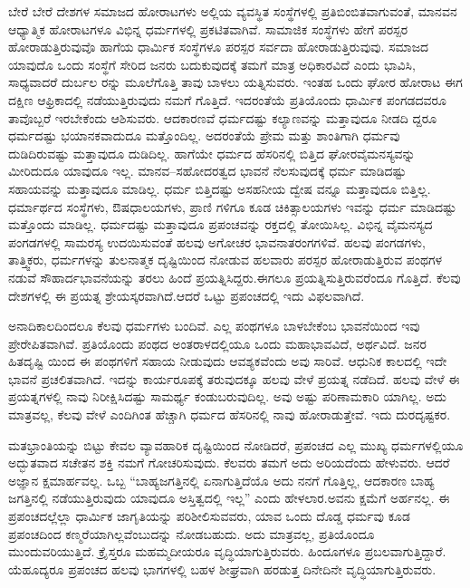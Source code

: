 ಬೇರೆ ಬೇರೆ ದೇಶಗಳ ಸಮಾಜದ ಹೋರಾಟಗಳು ಅಲ್ಲಿಯ ವ್ಯವಸ್ಥಿತ ಸಂಸ್ಥೆಗಳಲ್ಲಿ ಪ್ರತಿಬಿಂಬಿತವಾಗುವಂತೆ, ಮಾನವನ ಆಧ್ಯಾತ್ಮಿಕ ಹೋರಾಟಗಳೂ ವಿಭಿನ್ನ ಧರ್ಮಗಳಲ್ಲಿ ಪ್ರಕಟಿತವಾಗಿವೆ. ಸಾಮಾಜಿಕ ಸಂಸ್ಥೆಗಳು ಹೇಗೆ ಪರಸ್ಪರ ಹೋರಾಡುತ್ತಿರುವುವೊ ಹಾಗೆಯ ಧಾರ್ಮಿಕ ಸಂಸ್ಥೆಗಳೂ ಪರಸ್ಪರ ಸರ್ವದಾ ಹೋರಾಡುತ್ತಿರುವುವು. ಸಮಾಜದ ಯಾವುದೊ ಒಂದು ಸಂಸ್ಥೆಗೆ ಸೇರಿದ ಜನರು ಬದುಕುವುದಕ್ಕೆ ತಮಗೆ ಮಾತ್ರ ಅಧಿಕಾರವಿದೆ ಎಂದು ಭಾವಿಸಿ, ಸಾಧ್ಯವಾದರೆ ದುರ್ಬಲ ರನ್ನು ಮೂಲೆಗೊತ್ತಿ ತಾವು ಬಾಳಲು ಯತ್ನಿಸುವರು. ಇಂತಹ ಒಂದು ಘೋರ ಹೋರಾಟ ಈಗ ದಕ್ಷಿಣ ಆಫ್ರಿಕಾದಲ್ಲಿ ನಡೆಯುತ್ತಿರುವುದು ನಮಗೆ ಗೊತ್ತಿದೆ. ಇದರಂತೆಯೆ ಪ್ರತಿಯೊಂದು ಧಾರ್ಮಿಕ ಪಂಗಡದವರೂ ತಾವೊಬ್ಬರೆ ಇರಬೇಕೆಂದು ಆಶಿಸುವರು. ಆದಕಾರಣವೆ ಧರ್ಮದಷ್ಟು ಕಲ್ಯಾಣವನ್ನು ಮತ್ತಾವುದೂ ನೀಡದಿ ದ್ದರೂ ಧರ್ಮದಷ್ಟು ಭಯಾನಕವಾದುದೂ ಮತ್ತೊಂದಿಲ್ಲ. ಅದರಂತೆಯೆ ಪ್ರೇಮ ಮತ್ತು ಶಾಂತಿಗಾಗಿ ಧರ್ಮವು ದುಡಿದಿರುವಷ್ಟು ಮತ್ತಾವುದೂ ದುಡಿದಿಲ್ಲ. ಹಾಗೆಯೇ ಧರ್ಮದ ಹೆಸರಿನಲ್ಲಿ ಬಿತ್ತಿದ ಘೋರವೈಮನಸ್ಯವನ್ನು ಮೀರಿದುದೂ ಯಾವುದೂ ಇಲ್ಲ. ಮಾನವ–ಸಹೋದರತ್ವದ ಭಾವನೆ ನೆಲಸುವುದಕ್ಕೆ ಧರ್ಮ ಮಾಡಿದಷ್ಟು ಸಹಾಯವನ್ನು ಮತ್ತಾವುದೂ ಮಾಡಿಲ್ಲ. ಧರ್ಮ ಬಿತ್ತಿದಷ್ಟು ಅಸಹನೀಯ ದ್ವೇಷ ವನ್ನೂ ಮತ್ತಾವುದೂ ಬಿತ್ತಿಲ್ಲ. ಧರ್ಮಾರ್ಥದ ಸಂಸ್ಥೆಗಳು, ಔಷಧಾಲಯಗಳು, ಪ್ರಾಣಿ ಗಳಿಗೂ ಕೂಡ ಚಿಕಿತ್ಸಾಲಯಗಳು ಇವನ್ನು ಧರ್ಮ ಮಾಡಿದಷ್ಟು ಮತ್ತೊಂದು ಮಾಡಿಲ್ಲ. ಧರ್ಮದಷ್ಟು ಮತ್ತಾವುದೂ ಪ್ರಪಂಚವನ್ನು ರಕ್ತದಲ್ಲಿ ತೋಯಿಸಿಲ್ಲ. ವಿಭಿನ್ನ ವೈಮನಸ್ಯದ ಪಂಗಡಗಳಲ್ಲಿ ಸಾಮರಸ್ಯ ಉದಯಿಸುವಂತೆ ಹಲವು ಅಗೋಚರ ಭಾವನಾತರಂಗಗಳಿವೆ. ಹಲವು ಪಂಗಡಗಳು, ತಾತ್ತ್ವಿಕರು, ಧರ್ಮಗಳನ್ನು ತುಲನಾತ್ಮಕ ದೃಷ್ಟಿಯಿಂದ ನೋಡುವ ಹಲವಾರು ಪರಸ್ಪರ ಹೋರಾಡುತ್ತಿರುವ ಪಂಥಗಳ ನಡುವೆ ಸೌಹಾರ್ದಭಾವನೆಯನ್ನು ತರಲು ಹಿಂದೆ ಪ್ರಯತ್ನಿಸಿದ್ದರು.ಈಗಲೂ ಪ್ರಯತ್ನಿಸುತ್ತಿರುವರೆಂದೂ ಗೊತ್ತಿದೆ. ಕೆಲವು ದೇಶಗಳಲ್ಲಿ ಈ ಪ್ರಯತ್ನ ಶ್ರೇಯಸ್ಕರವಾಗಿದೆ.ಆದರೆ ಒಟ್ಟು ಪ್ರಪಂಚದಲ್ಲಿ ಇದು ವಿಫಲವಾಗಿದೆ.

ಅನಾದಿಕಾಲದಿಂದಲೂ ಕೆಲವು ಧರ್ಮಗಳು ಬಂದಿವೆ. ಎಲ್ಲ ಪಂಥಗಳೂ ಬಾಳಬೇಕೆಂಬ ಭಾವನೆಯಿಂದ ಇವು ಪ್ರೇರೇಪಿತವಾಗಿವೆ. ಪ್ರತಿಯೊಂದು ಪಂಥದ ಅಂತರಾಳದಲ್ಲಿಯೂ ಒಂದು ಮಹಾಭಾವವಿದೆ, ಅರ್ಥವಿದೆ. ಜನರ ಹಿತದೃಷ್ಟಿ ಯಿಂದ ಈ ಪಂಥಗಳಿಗೆ ಸಹಾಯ ನೀಡುವುದು ಆವಶ್ಯಕವೆಂದು ಅವು ಸಾರಿವೆ. ಆಧುನಿಕ ಕಾಲದಲ್ಲಿ ಇದೇ ಭಾವನೆ ಪ್ರಚಲಿತವಾಗಿದೆ. ಇದನ್ನು ಕಾರ್ಯರೂಪಕ್ಕೆ ತರುವುದಕ್ಕೂ ಹಲವು ವೇಳೆ ಪ್ರಯತ್ನ ನಡೆದಿದೆ. ಹಲವು ವೇಳೆ ಈ ಪ್ರಯತ್ನಗಳಲ್ಲಿ ನಾವು ನಿರೀಕ್ಷಿಸಿದಷ್ಟು ಸಾಮರ್ಥ್ಯ ಕಂಡುಬರುವುದಿಲ್ಲ. ಅವು ಅಷ್ಟು ಪರಿಣಾಮಕಾರಿ ಯಾಗಿಲ್ಲ. ಅದು ಮಾತ್ರವಲ್ಲ, ಕೆಲವು ವೇಳೆ ಎಂದಿಗಿಂತ ಹೆಚ್ಚಾಗಿ ಧರ್ಮದ ಹೆಸರಿನಲ್ಲಿ ನಾವು ಹೋರಾಡುತ್ತೇವೆ. ಇದು ದುರದೃಷ್ಟಕರ.

ಮತಭ್ರಾಂತಿಯನ್ನು ಬಿಟ್ಟು ಕೇವಲ ವ್ಯಾವಹಾರಿಕ ದೃಷ್ಟಿಯಿಂದ ನೋಡಿದರೆ, ಪ್ರಪಂಚದ ಎಲ್ಲ ಮುಖ್ಯ ಧರ್ಮಗಳಲ್ಲಿಯೂ ಅದ್ಭುತವಾದ ಸಚೇತನ ಶಕ್ತಿ ನಮಗೆ ಗೋಚರಿಸುವುದು. ಕೆಲವರು ತಮಗೆ ಅದು ಅರಿಯದೆಂದು ಹೇಳುವರು. ಆದರೆ ಅಜ್ಞಾನ ಕ್ಷಮಾರ್ಹವಲ್ಲ. ಒಬ್ಬ “ಬಾಹ್ಯಜಗತ್ತಿನಲ್ಲಿ ಏನಾಗುತ್ತಿದೆಯೊ ಅದು ನನಗೆ ಗೊತ್ತಿಲ್ಲ, ಆದಕಾರಣ ಬಾಹ್ಯ ಜಗತ್ತಿನಲ್ಲಿ ನಡೆಯುತ್ತಿರುವುದು ಯಾವುದೂ ಅಸ್ತಿತ್ವದಲ್ಲಿ ಇಲ್ಲ” ಎಂದು ಹೇಳಲಾರ.ಅವನು ಕ್ಷಮೆಗೆ ಅರ್ಹನಲ್ಲ. ಈ ಪ್ರಪಂಚದಲ್ಲೆಲ್ಲಾ ಧಾರ್ಮಿಕ ಜಾಗೃತಿಯನ್ನು ಪರಿಶೀಲಿಸುವವರು, ಯಾವ ಒಂದು ದೊಡ್ಡ ಧರ್ಮವು ಕೂಡ ಪ್ರಪಂಚದಿಂದ ಕಣ್ಮರೆಯಾಗಿಲ್ಲವೆಂಬುದನ್ನು ನೋಡಬಹುದು. ಅದು ಮಾತ್ರವಲ್ಲ, ಪ್ರತಿಯೊಂದೂ ಮುಂದುವರಿಯುತ್ತಿದೆ. ಕ್ರೈಸ್ತರೂ ಮಹಮ್ಮದೀಯರೂ ವೃದ್ಧಿಯಾಗುತ್ತಿರುವರು. ಹಿಂದೂಗಳೂ ಪ್ರಬಲವಾಗುತ್ತಿದ್ದಾರೆ. ಯೆಹೂದ್ಯರೂ ಪ್ರಪಂಚದ ಹಲವು ಭಾಗಗಳಲ್ಲಿ ಬಹಳ ಶೀಘ್ರವಾಗಿ ಹರಡುತ್ತ ದಿನೇದಿನೇ ವೃದ್ಧಿಯಾಗುತ್ತಿರುವರು.

